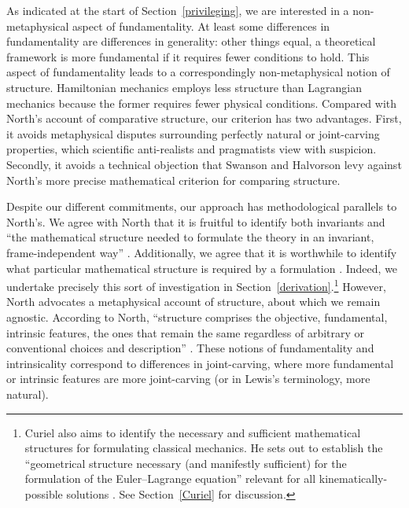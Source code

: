 \documentclass[12pt, twoside]{article}
\begin{document}
As indicated at the start of Section~\ref{privileging}, we are interested in a non-metaphysical aspect of fundamentality. At least some differences in fundamentality are differences in generality: other things equal, a theoretical framework is more fundamental if it requires fewer conditions to hold. This aspect of fundamentality leads to a correspondingly non-metaphysical notion of structure. Hamiltonian mechanics employs less structure than Lagrangian mechanics because the former requires fewer physical conditions. Compared with North's \parencites*[]{North} account of comparative structure, our criterion has two advantages. First, it avoids metaphysical disputes surrounding perfectly natural or joint-carving properties, which scientific anti-realists and pragmatists view with suspicion. Secondly, it avoids a technical objection that Swanson and Halvorson \parencites*[]{Swanson} levy against North's more precise mathematical criterion for comparing structure. 

Despite our different commitments, our approach has methodological parallels to North's. We agree with North that it is fruitful to identify both invariants and ``the mathematical structure needed to formulate the theory in an invariant, frame-independent way'' \parencites*[65]{North}. Additionally, we agree that it is worthwhile to identify what particular mathematical structure is required by a formulation \parencites[78]{North}. Indeed, we undertake precisely this sort of investigation in Section~\ref{derivation}.\footnote{Curiel also aims to identify the necessary and sufficient mathematical structures for formulating classical mechanics. He sets out to establish the ``geometrical structure necessary (and manifestly sufficient) for the formulation of the Euler--Lagrange equation'' relevant for all kinematically-possible solutions \parencites*[292]{Curiel}. See Section~\ref{Curiel} for discussion.} However, North advocates a metaphysical account of structure, about which we remain agnostic. According to North, ``structure comprises the objective, fundamental, intrinsic features, the ones that remain the same regardless of arbitrary or conventional choices and description'' \parencites*[66]{North}. These notions of fundamentality and intrinsicality correspond to differences in joint-carving, where more fundamental or intrinsic features are more joint-carving (or in Lewis's \parencites*[]{Lewis1983} terminology, more natural). 
\end{document}
